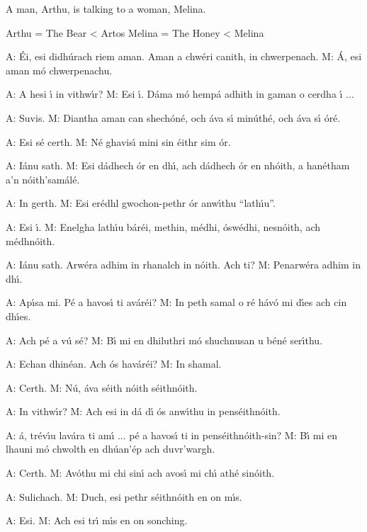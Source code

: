 A man, Arthu, is talking to a woman, Melina.

Arthu = The Bear < Artos
Melina = The Honey < Melina

A: \'{E}i, esi didh\'{u}rach riem aman. Aman a chw\'{e}ri canith, in chwerpenach.
M: \'{A}, esi aman m\'{o} chwerpenachu. 

A: A hesi \'{\i} in vithw\'{\i}r?
M: Esi \'{\i}. D\'{a}ma m\'{o} hemp\'{a} adhith in gaman o cerdha \'{\i} ...

A: Suvis.
M: Diantha aman can shech\'{o}n\'{e}, och \'{a}va s\'{\i} min\'{u}th\'{e}, och \'{a}va s\'{\i} \'{o}r\'{e}.

A: Esi s\'{e} certh.
M: N\'{e} ghavis\'{\i} mini sin \'{e}ithr sim \'{o}r.

A: I\'{a}nu sath.
M: Esi d\'{a}dhech \'{o}r en dh\'{\i}, ach d\'{a}dhech \'{o}r en nh\'{o}ith, a han\'{e}tham a’n n\'{o}ith’sam\'{a}l\'{e}.

A: In gerth.
M: Esi er\'{e}dhl gwochon-pethr \'{o}r anw\'{\i}thu ``lath\'{\i}u''.

A: Esi \'{\i}.
M: Enelgha lath\'{\i}u b\'{a}r\'{e}i, methin, m\'{e}dhi, \'{o}sw\'{e}dhi, nesn\'{o}ith, ach m\'{e}dhn\'{o}ith.

A: I\'{a}nu sath. Arw\'{e}ra adhim in rhanalch in n\'{o}ith. Ach ti?
M: Penarw\'{e}ra adhim in dh\'{\i}.

A: Ap\'{\i}sa mi. P\'{e} a havos\'{\i} ti av\'{a}r\'{e}i?
M: In peth samal o r\'{e} h\'{a}v\'{o} mi d\'{\i}es ach cin dh\'{\i}es.

A: Ach p\'{e} a v\'{u} s\'{e}?
M: B\'{\i} mi en dhiluthri m\'{o} shuchnusan u b\'{e}n\'{e} ser\'{\i}thu.

A: Echan dhin\'{e}an. Ach \'{o}s hav\'{a}r\'{e}i?
M: In shamal.

A: Certh.
M: N\'{u}, \'{a}va s\'{e}ith n\'{o}ith s\'{e}ithn\'{o}ith.

A: In vithw\'{\i}r?
M: Ach esi in d\'{a} d\'{\i} \'{o}s anw\'{\i}thu in pens\'{e}ithn\'{o}ith.

A: \'{a}, tr\'{e}v\'{\i}u lav\'{a}ra ti am\'{\i} ... p\'{e} a havos\'{\i} ti in pens\'{e}ithn\'{o}ith-sin?
M: B\'{\i} mi en lhauni m\'{o} chwolth en dh\'{u}an'\'{e}p ach duvr'wargh.

A: Certh.
M: Av\'{o}thu mi chi sin\'{\i} ach avos\'{\i} mi ch\'{\i} ath\'{e} sin\'{o}ith.

A: Sulichach.
M: Duch, esi pethr s\'{e}ithn\'{o}ith en on m\'{\i}s.

A: Esi.
M: Ach esi tr\'{\i} m\'{\i}s en on sonching.

